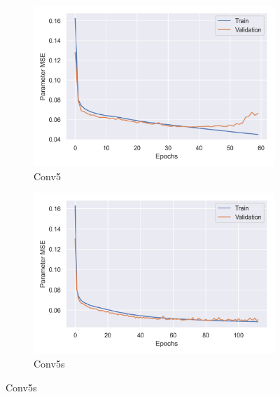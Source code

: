 \begin{figure}[t]
    \begin{subfigure}[b]{0.45\textwidth}
        \centering
        \includegraphics[width=\textwidth]{figures/inverse-synth/loss-plots/conv5-mel.png}
        \caption{Conv5}
    \end{subfigure}
    \begin{subfigure}[b]{0.45\textwidth}
        \centering
        \includegraphics[width=\textwidth]{figures/inverse-synth/loss-plots/conv5s-mel.png}
        \caption{Conv5s}
    \end{subfigure}
\end{figure}